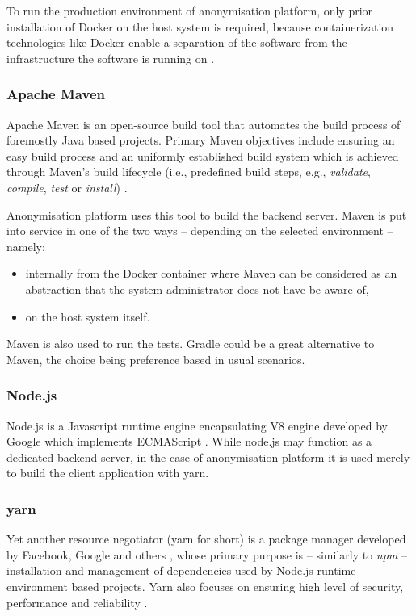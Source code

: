 \documentclass[a4paper,twoside,12pt]{book}
\begin{document}
To run the production environment of anonymisation platform, only prior installation of Docker on the host system is required, because containerization technologies like Docker enable a separation of the software from the infrastructure the software is running on \cite{bib:docker_docs, bib:docker_book}.

\subsubsection{Apache Maven}

Apache Maven is an open-source build tool that automates the build process of foremostly Java based projects. Primary Maven objectives include ensuring an easy build process and an uniformly established build system which is achieved through Maven's build lifecycle (i.e., predefined build steps, e.g., \textit{validate}, \textit{compile}, \textit{test} or \textit{install}) \cite{bib:maven_docs}.

Anonymisation platform uses this tool to build the backend server. Maven is put into service in one of the two ways – depending on the selected environment – namely:
\begin{itemize}
\item internally from the Docker container where Maven can be considered as an abstraction that the system administrator does not have be aware of,
\item on the host system itself.
\end{itemize}

Maven is also used to run the tests. Gradle could be a great alternative to Maven, the choice being preference based in usual scenarios.

\subsubsection{Node.js}

Node.js is a Javascript runtime engine encapsulating V8 engine developed by Google which implements ECMAScript \cite{bib:v8_docs}. While node.js may function as a dedicated backend server, in the case of anonymisation platform it is used merely to build the client application with yarn.

\subsubsection{yarn}

Yet another resource negotiator (yarn for short) is a package manager developed by Facebook, Google and others \cite{bib:yarn_fb}, whose primary purpose is – similarly to \textit{npm} – installation and management of dependencies used by Node.js runtime environment based projects. Yarn also focuses on ensuring high level of security, performance and reliability \cite{bib:yarn_docs}.
\end{document}
